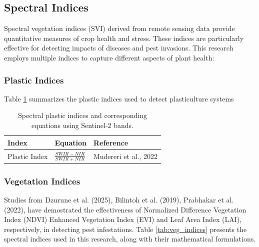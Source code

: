 \documentclass{article} %
\begin{document}
        \subsection{Spectral Indices}

            Spectral vegetation indices (SVI) derived from remote sensing data provide quantitative measures of crop health and stress. These indices are particularly effective for detecting impacts of diseases and pest invasions. This research employs multiple indices to capture different aspects of plant health:

            \subsubsection{Plastic Indices}
                Table \ref{tab:plastic_indices} summarizes the plastic indices used to detect plasticulture systems

                \begin{table}[!h]
                \centering
                \caption{Spectral plastic indices and corresponding equations using Sentinel-2 bands.}
                \label{tab:plastic_indices}
                \renewcommand{\arraystretch}{1.4}
                \small
                    \begin{tabular}{p{3cm} p{3cm} p{3cm}}
                    \textbf{Index} & \textbf{Equation} & \textbf{Reference} \\
                    \hline
                    Plastic Index & 
                    $\frac{SWIR - NIR}{SWIR + NIR}$ & 
                    Mudereri et al., 2022
                    \end{tabular}
                \end{table}

            \subsubsection{Vegetation Indices}

                Studies from Dzurune et al. (2025), Bilintoh et al. (2019), Prabhakar et al. (2022), have demostrated the effectiveness of Normalized Difference Vegetation Index (NDVI) Enhanced Vegetation Index (EVI) and Leaf Area Index (LAI), respectively, in detecting pest infestations. Table \ref{tab:veg_indices} presents the spectral indices used in this research, along with their mathematical formulations.
\end{document}
